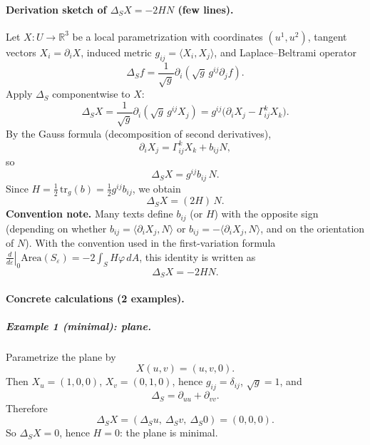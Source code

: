 \documentclass[12pt,a4paper]{article}
\theoremstyle{plain}
\theoremstyle{definition}      %
\begin{document}
\paragraph{Derivation sketch of $\Delta_S X=-2HN$ (few lines).}
Let $X\colon U\to\mathbb{R}^3$ be a local parametrization with coordinates $(u^1,u^2)$,
tangent vectors $X_i=\partial_i X$, induced metric $g_{ij}=\langle X_i,X_j\rangle$,
and Laplace--Beltrami operator
\[
\Delta_S f=\frac{1}{\sqrt{g}}\partial_i\!\left(\sqrt{g}\,g^{ij}\partial_j f\right).
\]
Apply $\Delta_S$ componentwise to $X$:
\[
\Delta_S X=\frac{1}{\sqrt{g}}\partial_i\!\left(\sqrt{g}\,g^{ij}X_j\right)
= g^{ij}\bigl(\partial_i X_j-\Gamma^k_{ij}X_k\bigr).
\]
By the Gauss formula (decomposition of second derivatives),
\[
\partial_i X_j=\Gamma^k_{ij}X_k + b_{ij}N,
\]
so
\[
\Delta_S X=g^{ij}b_{ij}\,N.
\]
Since $H=\tfrac12\,\mathrm{tr}_g(b)=\tfrac12 g^{ij}b_{ij}$, we obtain
\[
\Delta_S X = (2H)\,N.
\]
\textbf{Convention note.} Many texts define $b_{ij}$ (or $H$) with the opposite sign (depending on whether
$b_{ij}=\langle \partial_i X_j,N\rangle$ or $b_{ij}=-\langle \partial_i X_j,N\rangle$, and on the orientation of $N$).
With the convention used in the first-variation formula
$\left.\tfrac{d}{d\varepsilon}\right|_0\!\mathrm{Area}(S_\varepsilon)=-2\int_S H\varphi\,dA$,
this identity is written as
\[
\Delta_S X = -2HN.
\]

\bigskip
\paragraph{Concrete calculations (2 examples).}

\subparagraph{Example 1 (minimal): plane.}
Parametrize the plane by
\[
X(u,v)=(u,v,0).
\]
Then $X_u=(1,0,0)$, $X_v=(0,1,0)$, hence $g_{ij}=\delta_{ij}$, $\sqrt{g}=1$, and
\[
\Delta_S=\partial_{uu}+\partial_{vv}.
\]
Therefore
\[
\Delta_S X = (\Delta_S u,\ \Delta_S v,\ \Delta_S 0)=(0,0,0).
\]
So $\Delta_S X=0$, hence $H=0$: the plane is minimal.
\end{document}

